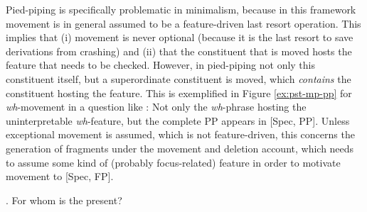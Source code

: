 Pied-piping is specifically problematic in minimalism, because in this framework movement is in general assumed to be a feature-driven last resort operation. This implies that (i) movement is never optional (because it is the last resort to save derivations from crashing) and (ii) that the constituent that is moved hosts the feature that needs to be checked. However, in pied-piping not only this constituent itself, but a superordinate constituent is moved, which \textit{contains} the constituent hosting the feature. This is exemplified in Figure \ref{ex:pst-mp-pp} for \textit{wh}-movement in a question like \Next: Not only the \textit{wh}-phrase hosting the uninterpretable \textit{wh}-feature, but the complete PP appears in [Spec, PP]. Unless exceptional movement \citep{weir2014} is assumed, which is not feature-driven, this concerns the generation of fragments under the movement and deletion account, which needs to assume some kind of (probably focus-related) feature in order to motivate movement to [Spec, FP].

\ex. For whom is the present? \label{ex:pst-mp}

